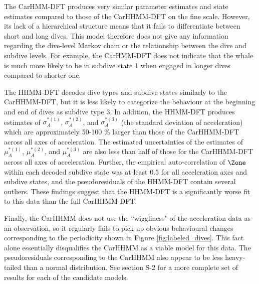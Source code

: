 The CarHMM-DFT produces very similar parameter estimates and state estimates compared to those of the CarHHMM-DFT on the fine scale. However, its lack of a hierarchical structure means that it fails to differentiate between short and long dives. This model therefore does not give any information regarding the dive-level Markov chain or the relationship between the dive and subdive levels. For example, the CarHMM-DFT does not indicate that the whale is much more likely to be in subdive state 1 when engaged in longer dives compared to shorter one.

The HHMM-DFT decodes dive types and subdive states similarly to the CarHHMM-DFT, but it is less likely to categorize the behaviour at the beginning and end of dives as subdive type 3. In addition, the HHMM-DFT produces estimates of $\sigma_A^{*(1)}$, $\sigma_A^{*(2)}$, and $\sigma_A^{*(3)}$ (the standard deviation of acceleration) which are approximately 50-100 \% larger than those of the CarHHMM-DFT across all axes of acceleration. The estimated uncertainties of the estimates of $\mu_A^{*(1)}$, $\mu_A^{*(2)}$, and $\mu_A^{*(3)}$ are also less than half of those for the CarHHMM-DFT across all axes of acceleration. Further, the empirical auto-correlation of $\Zone$ within each decoded subdive state was at least 0.5 for all acceleration axes and subdive states, and the pseudoresiduals of the HHMM-DFT contain several outliers. These findings suggest that the HHMM-DFT is a significantly worse fit to this data than the full CarHHMM-DFT.

Finally, the CarHHMM does not use the ``wiggliness" of the acceleration data as an observation, so it regularly fails to pick up obvious behavioural changes corresponding to the periodicity shown in Figure \ref{fig:labeled_dives}. This fact alone essentially disqualifies the CarHHMM as a viable model for this data. The pseudoresiduals corresponding to the CarHHMM also appear to be less heavy-tailed than a normal distribution. See section S-2 for a more complete set of results for each of the candidate models.